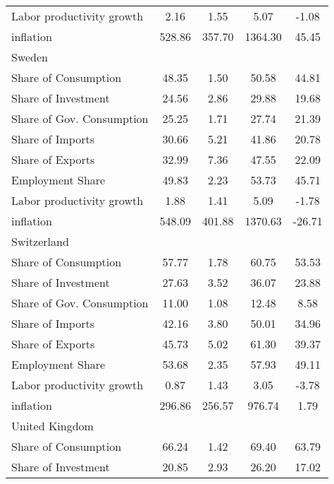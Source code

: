 {\begin{longtable}{l*{1}{cccc}}
Labor productivity growth&        2.16&        1.55&        5.07&       -1.08\\
inflation           &      528.86&      357.70&     1364.30&       45.45\\
Sweden              &            &            &            &            \\
Share of Consumption&       48.35&        1.50&       50.58&       44.81\\
Share of Investment &       24.56&        2.86&       29.88&       19.68\\
Share of Gov. Consumption&       25.25&        1.71&       27.74&       21.39\\
Share of Imports    &       30.66&        5.21&       41.86&       20.78\\
Share of Exports    &       32.99&        7.36&       47.55&       22.09\\
Employment Share    &       49.83&        2.23&       53.73&       45.71\\
Labor productivity growth&        1.88&        1.41&        5.09&       -1.78\\
inflation           &      548.09&      401.88&     1370.63&      -26.71\\
Switzerland         &            &            &            &            \\
Share of Consumption&       57.77&        1.78&       60.75&       53.53\\
Share of Investment &       27.63&        3.52&       36.07&       23.88\\
Share of Gov. Consumption&       11.00&        1.08&       12.48&        8.58\\
Share of Imports    &       42.16&        3.80&       50.01&       34.96\\
Share of Exports    &       45.73&        5.02&       61.30&       39.37\\
Employment Share    &       53.68&        2.35&       57.93&       49.11\\
Labor productivity growth&        0.87&        1.43&        3.05&       -3.78\\
inflation           &      296.86&      256.57&      976.74&        1.79\\
United Kingdom      &            &            &            &            \\
Share of Consumption&       66.24&        1.42&       69.40&       63.79\\
Share of Investment &       20.85&        2.93&       26.20&       17.02\\

\end{longtable}}
